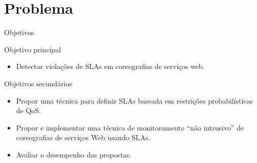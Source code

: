 \documentclass[xcolor=svgnames]{beamer}
\begin{document}
\section{Problema}

    \begin{frame}{Objetivos}
        \begin{block}{Objetivo principal}\vspace{-.3\baselineskip}
        	\begin{itemize}
                  \item Detectar violações de SLAs em coreografias de serviços web.
            \end{itemize}
        \end{block}
        \begin{block}{Objetivos secundários}\vspace{-.3\baselineskip}
        	\begin{itemize}
		  \item	Propor uma técnica para definir SLAs baseada em restrições probabilísticas de QoS.
                  \item Propor e implementar uma técnica de monitoramento ``não intrusivo'' de coreografias
                    de serviços Web usando SLAs.
                  \item Avaliar o desempenho das propostas. %
        	\end{itemize}
        \end{block}
    \end{frame}
\end{document}
